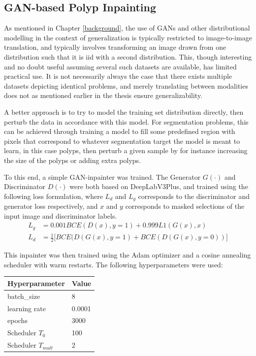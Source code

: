 \subsection{GAN-based Polyp Inpainting}
As mentioned in Chapter \ref{background}, the use of GANs and other distributional modelling in the context of generalization is typically restricted to image-to-image translation, and typically involves transforming an image drawn from one distribution such that it is iid with a second distribution. This, though interesting and no doubt useful assuming several such datasets are available, has limited practical use. It is not necessarily always the case that there exists multiple datasets depicting identical problems, and merely translating between modalities does not as mentioned earlier in the thesis ensure generalizability.

A better approach is to try to model the training set distribution directly, then perturb the data in accordance with this model. For segmentation problems, this can be achieved through training a model to fill some predefined region with pixels that correspond to whatever segmentation target the model is meant to learn, in this case polyps, then perturb a given sample by for instance increasing the size of the polyps or adding extra polyps.

To this end, a simple GAN-inpainter was trained. The Generator \(G(\cdot)\) and Discriminator \(D(\cdot)\) were both based on DeepLabV3Plus, and trained using the following loss formulation, where \(L_d\) and \(L_g\) corresponds to the discriminator and generator loss respectively, and \(x\) and \(y\) corresponds to masked selections of the input image and discriminator labels. 
\begin{align}
    L_g &= 0.001 BCE(D(x),y=1) + 0.999 L1(G(x), x) \\
    L_d &= \frac{1}{2}\big[ BCE(D(G(x),y=1)+BCE(D(G(x), y=0)) \big]
\end{align}

This inpainter was then trained using the Adam optimizer and a cosine annealing scheduler with warm restarts. The following hyperparameters were used:

\begin{tabularx}{\linewidth}{@{}XX@{}}
    \toprule
     Hyperparameter & Value \\
     \midrule
     batch\_size & 8 \\
     learning rate & 0.0001 \\
     epochs & 3000 \\
     Scheduler \(T_0\) & 100\\
     Scheduler \(T_{mult}\) & 2 \\
     \bottomrule
\end{tabularx}

